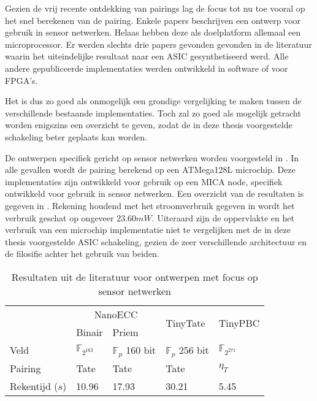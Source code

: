 Gezien de vrij recente ontdekking van pairings lag de focus tot nu toe vooral op het snel berekenen van de pairing. Enkele papers beschrijven een ontwerp voor gebruik in sensor netwerken. Helaas hebben deze als doelplatform allemaal een microprocessor. Er werden slechts drie papers gevonden gevonden in de literatuur waarin het uiteindelijke resultaat naar een ASIC gesynthetiseerd werd. Alle andere  gepubliceerde implementaties werden ontwikkeld in software of voor FPGA's.

Het is dus zo goed als onmogelijk een grondige vergelijking te maken tussen de verschillende bestaande implementaties. Toch zal zo goed als mogelijk getracht worden enigszins een overzicht te geven, zodat de in deze thesis voorgestelde schakeling beter geplaats kan worden.

De ontwerpen specifiek gericht op sensor netwerken worden voorgesteld in \cite{tinypbc, tinytate, nanoecc}. In alle gevallen wordt de pairing berekend op een ATMega128L microchip. Deze implementaties zijn ontwikkeld voor gebruik op een MICA node, specifiek ontwikkeld voor gebruik in sensor netwerken. Een overzicht van de resultaten is gegeven in . Rekening houdend met het stroomverbruik gegeven in \cite{nanoecc} wordt het verbruik geschat op ongeveer $23.60mW$. Uiteraard zijn de oppervlakte en het verbruik van een microchip implementatie niet te vergelijken met de in deze thesis voorgestelde ASIC schakeling, gezien de zeer verschillende architectuur en de filosifie achter het gebruik van beiden.

\begin{table}[h]
	\caption{Resultaten uit de literatuur voor ontwerpen met focus op sensor netwerken}
	\label{tabel-resultaten-sensor}

	\centering
	\begin{tabular}{|l||l|l|l|l|}
		\hline
		&	\multicolumn{2}{c|}{NanoECC \cite{nanoecc}}	& \multirow{2}{*}{TinyTate \cite{tinytate}}	& \multirow{2}{*}{TinyPBC \cite{tinypbc}}\\
		\cline{2-3}
		& Binair	& Priem	&	& \\
 		\hline \hline
		Veld	& $\mathbb{F}_{2^{163}}$	& $\mathbb{F}_{p}$ 160 bit	& $\mathbb{F}_{p}$ 256 bit	& $\mathbb{F}_{2^{271}}$ \\ \hline
		Pairing	& Tate	& Tate	& Tate	& $\eta_T$ \\ \hline
		Rekentijd ($s$)	& 	10.96	& 17.93	& 30.21	& 5.45\\ \hline		
	\end{tabular}
\end{table}

